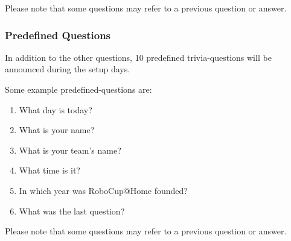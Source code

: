Please note that some questions may refer to a previous question or answer. 

\subsubsection{Predefined Questions}
In addition to the other questions, 10 predefined trivia-questions will be announced during the setup days.

Some example predefined-questions are:
\begin{enumerate}
    \item What day is today?
    \item What is your name?
    \item What is your team's name?
    \item What time is it?
    \item In which year was RoboCup@Home founded?
    \item What was the last question?
\end{enumerate}

Please note that some questions may refer to a previous question or answer. 

